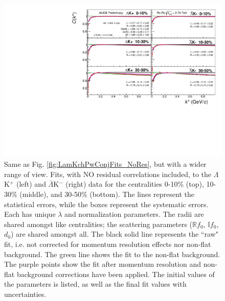 \documentclass[../AnalysisNoteJBuxton.tex]{subfiles}
\begin{document}
\begin{figure}[h]
  \centering
  \includegraphics[width=\textwidth]{7_ResultsAndDiscussion/Figures/canKStarCfwFitsLamKchPwConj_0010_1030_3050UnZoomed_MomResCrctn_NonFlatBgdCrctn_NoRes.pdf}
  \caption[$\Lambda$K$^{+}$($\bar{\Lambda}$K$^{-}$) Fits with No Residuals (Wide Range)]{Same as Fig. \ref{fig:LamKchPwConjFits_NoRes}, but with a wider range of view.
Fits, with NO residual correlations included, to the $\Lambda$K$^{+}$ (left) and $\bar{\Lambda}$K$^{-}$ (right) data for the centralities 0-10\% (top), 10-30\% (middle), and 30-50\% (bottom).
The lines represent the statistical errors, while the boxes represent the systematic errors.  
Each has unique $\lambda$ and normalization parameters.
The radii are shared amongst like centralities; the scattering parameters ($\mathbb{R}f_{0}$, $\mathbb{I}f_{0}$, $d_{0}$) are shared amongst all.
The black solid line represents the ``raw" fit, i.e. not corrected for momentum resolution effects nor non-flat background.  
The green line shows the fit to the non-flat background.
The purple points show the fit after momentum resolution and non-flat background corrections have been applied.
The initial values of the parameters is listed, as well as the final fit values with uncertainties.}
  \label{fig:LamKchPwConjFitsUnZoomed_NoRes}
\end{figure}
\end{document}
